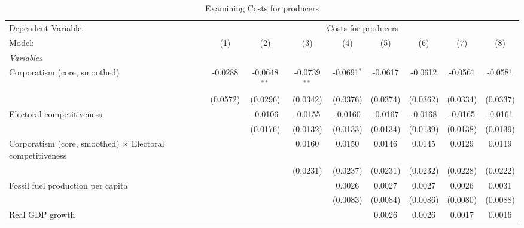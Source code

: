 
\begin{table}[htbp]
   \caption{Examining Costs for producers}
   \centering
   \begin{tabular}{lcccccccc}
      \tabularnewline \midrule \midrule
      Dependent Variable: & \multicolumn{8}{c}{Costs for producers}\\
      Model:                                                           & (1)      & (2)            & (3)            & (4)           & (5)      & (6)      & (7)                    & (8)\\  
      \midrule
      \emph{Variables}\\
      Corporatism (core, smoothed)                                     & -0.0288  & -0.0648$^{**}$ & -0.0739$^{**}$ & -0.0691$^{*}$ & -0.0617  & -0.0612  & -0.0561                & -0.0581\\   
                                                                       & (0.0572) & (0.0296)       & (0.0342)       & (0.0376)      & (0.0374) & (0.0362) & (0.0334)               & (0.0337)\\   
      Electoral competitiveness                                        &          & -0.0106        & -0.0155        & -0.0160       & -0.0167  & -0.0168  & -0.0165                & -0.0161\\   
                                                                       &          & (0.0176)       & (0.0132)       & (0.0133)      & (0.0134) & (0.0139) & (0.0138)               & (0.0139)\\   
      Corporatism (core, smoothed) $\times$ Electoral competitiveness  &          &                & 0.0160         & 0.0150        & 0.0146   & 0.0145   & 0.0129                 & 0.0119\\   
                                                                       &          &                & (0.0231)       & (0.0237)      & (0.0231) & (0.0232) & (0.0228)               & (0.0222)\\   
      Fossil fuel production per capita                                &          &                &                & 0.0026        & 0.0027   & 0.0027   & 0.0026                 & 0.0031\\   
                                                                       &          &                &                & (0.0083)      & (0.0084) & (0.0086) & (0.0080)               & (0.0088)\\   
      Real GDP growth                                                  &          &                &                &               & 0.0026   & 0.0026   & 0.0017                 & 0.0016\\   

\end{tabular}
\end{table}
